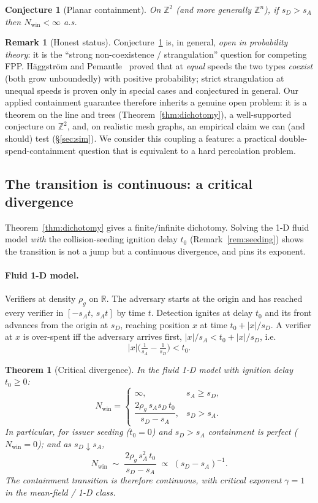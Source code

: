 \documentclass[11pt]{article}
\theoremstyle{plain}
\newtheorem{theorem}{Theorem}
\newtheorem{conjecture}{Conjecture}
\theoremstyle{definition}
\newtheorem{remark}{Remark}
\newcommand{\Nwin}{N_{\mathrm{win}}}
\newcommand{\R}{\mathbb{R}}
\begin{document}
\begin{conjecture}[Planar containment]\label{conj:planar}
On $\mathbb{Z}^2$ (and more generally $\mathbb{Z}^n$), if $s_D>s_A$ then
$\Nwin<\infty$ a.s.
\end{conjecture}

\begin{remark}[Honest status]
Conjecture~\ref{conj:planar} is, in general, \emph{open in probability theory}: it
is the ``strong non-coexistence / strangulation'' question for competing FPP.
H\"aggstr\"om and Pemantle~\cite{HaggstromPemantle1998} proved that at \emph{equal}
speeds the two types \emph{coexist} (both grow unboundedly) with positive
probability; strict strangulation at unequal speeds is proven only in special cases
and conjectured in general. Our applied containment guarantee therefore inherits a
genuine open problem: it is a theorem on the line and trees
(Theorem~\ref{thm:dichotomy}), a well-supported conjecture on $\mathbb{Z}^2$, and,
on realistic mesh graphs, an empirical claim we can (and should) test
(\S\ref{sec:sim}). We consider this coupling a feature: a practical
double-spend-containment question that is equivalent to a hard percolation
problem.
\end{remark}

\subsection{The transition is continuous: a critical divergence}\label{sub:critical}

Theorem~\ref{thm:dichotomy} gives a finite/infinite dichotomy. Solving the 1-D
fluid model \emph{with} the collision-seeding ignition delay $t_0$
(Remark~\ref{rem:seeding}) shows the transition is not a jump but a continuous
divergence, and pins its exponent.

\paragraph{Fluid 1-D model.} Verifiers at density $\rho_g$ on $\R$. The adversary
starts at the origin and has reached every verifier in $[-s_At,\,s_At]$ by time $t$.
Detection ignites at delay $t_0$ and its front advances from the origin at $s_D$,
reaching position $x$ at time $t_0+|x|/s_D$. A verifier at $x$ is over-spent iff the
adversary arrives first, $|x|/s_A < t_0 + |x|/s_D$, i.e.
\[
|x|\Big(\tfrac{1}{s_A}-\tfrac{1}{s_D}\Big) < t_0 .
\]

\begin{theorem}[Critical divergence]\label{thm:critical}
In the fluid 1-D model with ignition delay $t_0\ge 0$:
\[
\Nwin=\begin{cases}
\infty, & s_A\ge s_D,\\[2pt]
\dfrac{2\rho_g\, s_A s_D\, t_0}{\,s_D-s_A\,}, & s_D> s_A.
\end{cases}
\]
In particular, for issuer seeding ($t_0=0$) and $s_D>s_A$ containment is perfect
($\Nwin=0$); and as $s_D\downarrow s_A$,
\[
\boxed{\;\Nwin \;\sim\; \frac{2\rho_g\, s_A^2\, t_0}{\,s_D-s_A\,}\;\propto\;(s_D-s_A)^{-1}.\;}
\]
The containment transition is therefore \emph{continuous}, with critical exponent
$\gamma=1$ in the mean-field / 1-D class.
\end{theorem}
\end{document}
